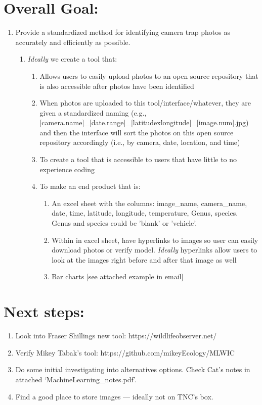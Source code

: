 \documentclass[11pt,a4paper]{article}\usepackage[]{graphicx}\usepackage[]{color}
\begin{document}
\section*{Overall Goal:}
\begin{enumerate}
\item Provide a standardized method for identifying camera trap photos as accurately and efficiently as possible.
  \begin{enumerate}
  \item \emph{Ideally} we create a tool that:
    \begin{enumerate}
    \item Allows users to easily upload photos to an open source repository that is also accessible after photos have been identified
    \item When photos are uploaded to this tool/interface/whatever, they are given a standardized naming (e.g., [camera.name]\_[date.range]\_[latitudexlongitude]\_[image.num].jpg) and then the interface will sort the photos on this open source repository accordingly (i.e., by camera, date, location, and time)
    \item To create a tool that is accessible to users that have little to no experience coding
    \item To make an end product that is:
      \begin{enumerate}
      \item An excel sheet with the columns: image\_name, camera\_name, date, time, latitude, longitude, temperature, Genus, species. Genus and species could be 'blank' or 'vehicle'. 
      \item Within in excel sheet, have hyperlinks to images so user can easily download photos or verify model. \emph{Ideally} hyperlinks allow users to look at the images right before and after that image as well
      \item Bar charts [see attached example in email]
      \end{enumerate}
    \end{enumerate}
  \end{enumerate}
\end{enumerate}

\section*{Next steps:}
\begin{enumerate}
\item Look into Fraser Shillings new tool: https://wildlifeobserver.net/
\item Verify Mikey Tabak's tool: https://github.com/mikeyEcology/MLWIC
\item Do some initial investigating into alternatives options. Check Cat's notes in attached `MachineLearning\_notes.pdf'.
\item Find a good place to store images --- ideally not on TNC's box. 
\end{enumerate}
\end{document}
